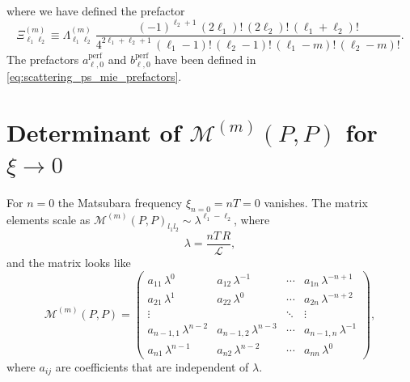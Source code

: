 where we have defined the prefactor
\begin{equation}
\Xi_{\ell_1 \ell_2}^{(m)} \equiv \Lambda_{\ell_1 \ell_2}^{(m)} \, \frac{(-1)^{\ell_2+1} \, (2\ell_1)! \, (2\ell_2)! \, (\ell_1+\ell_2)!}{4^{2\ell_1+\ell_2+1} \, (\ell_1-1)! \, (\ell_2-1)! \, (\ell_1-m)! \, (\ell_2-m)!}.
\end{equation}
The prefactors $a_{\ell,0}^\text{perf}$ and $b_{\ell,0}^\text{perf}$ have been
defined in \eqref{eq:scattering_ps_mie_prefactors}.

\section{Determinant of $\mathcal{M}^{(m)}(P,P)$ for $\xi\to0$}

\label{appendix_det}

For $n=0$ the Matsubara frequency $\xi_{n=0}=nT=0$ vanishes.
The matrix elements scale
as $\mathcal{M}^{(m)}(P,P)_{l_1 l_2} \sim \lambda^{\ell_1-\ell_2}$, where
\begin{equation}
\lambda = \frac{nT \, R}{\mathcal{L}},
\end{equation}
and the matrix looks like
\begin{equation}
\mathcal{M}^{(m)}(P,P) = \left(
\begin{array}{cccc}
a_{11}\,\lambda^{0}      & a_{12}\,\lambda^{-1}        & \cdots & a_{1n}\,\lambda^{-n+1}  \\
a_{21}\,\lambda^{1}      & a_{22}\,\lambda^{0}         & \cdots & a_{2n}\,\lambda^{-n+2}  \\
\vdots               &                      & \ddots   & \vdots              \\
a_{n-1,1}\,\lambda^{n-2} & a_{n-1,2}\,\lambda^{n-3}    & \cdots & a_{n-1,n}\,\lambda^{-1} \\
a_{n1}   \,\lambda^{n-1}    & a_{n2}\,\lambda^{n-2}    & \cdots & a_{nn}   \,\lambda^{0} 
\end{array}
\right),
\end{equation}
where $a_{ij}$ are coefficients that are independent of $\lambda$.

